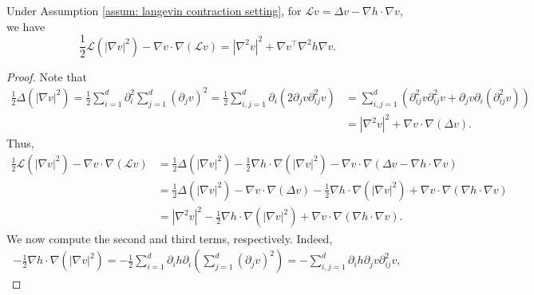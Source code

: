 \documentclass[twoside,11pt]{article}
\newcommand{\1}{\mathbf{1}}
\newcommand{\cL}{\mathcal{L}}
\numberwithin{equation}{section}
\begin{document}
\begin{lemma} Under Assumption \ref{assum: langevin contraction setting}, for $ \cL v = \Delta v - \nabla h\cdot \nabla v$, we have
\begin{equation}\label{eq: bochner}
    \frac{1}{2}\cL(|\nabla v|^2) - \nabla v \cdot \nabla(\cL v) = |\nabla^2 v|^2 + \nabla v^{\top} \nabla^2 h \nabla v.
\end{equation}
\end{lemma}
\begin{proof}
    Note that
    \begin{equation}
        \begin{aligned}
            \frac{1}{2}\Delta (|\nabla v|^2) = \frac{1}{2} \sum_{i=1}^d \partial_i^2 \sum_{j=1}^d (\partial_j v)^2 = \frac{1}{2}\sum_{i,j=1}^d \partial_i (2\partial_j v \partial_{ij}^2 v) &= \sum_{i,j=1}^d (\partial_{ij}^2 v \partial_{ij}^2 v + \partial_j v \partial_i (\partial_{ij}^2 v))\\
            & = |\nabla^2 v|^2 + \nabla v \cdot \nabla (\Delta v).
        \end{aligned}
    \end{equation}
    Thus,
    \begin{equation}\label{eq: mid}
        \begin{aligned}
        \frac{1}{2} \cL(|\nabla v|^2) - \nabla v \cdot \nabla (\cL v) &= \frac{1}{2} \Delta (|\nabla v|^2) - \frac{1}{2} \nabla h\cdot \nabla (|\nabla v|^2) - \nabla v \cdot \nabla (\Delta v - \nabla h \cdot \nabla v)\\
        & = \frac{1}{2}\Delta (|\nabla v|^2) -\nabla v \cdot \nabla (\Delta v) - \frac{1}{2}\nabla h \cdot \nabla (|\nabla v|^2) + \nabla v \cdot \nabla (\nabla h \cdot \nabla v)\\
        & = |\nabla^2 v|^2 - \frac{1}{2}\nabla h \cdot \nabla(|\nabla v|^2) + \nabla v \cdot \nabla(\nabla h \cdot \nabla v).
        \end{aligned}
    \end{equation}
We now compute the second and third terms, respectively. Indeed, %
\begin{equation}\label{eq: mid 2}
    \begin{aligned}
        -\frac{1}{2}\nabla h\cdot \nabla(|\nabla v|^2) = -\frac{1}{2}\sum_{i=1}^d \partial_i h\partial_i (\sum_{j=1}^d (\partial_j v)^2) = -\sum_{i,j=1}^d \partial_i h \partial_j v \partial_{ij}^2 v,
    \end{aligned}
\end{equation}

\end{proof}
\end{document}
